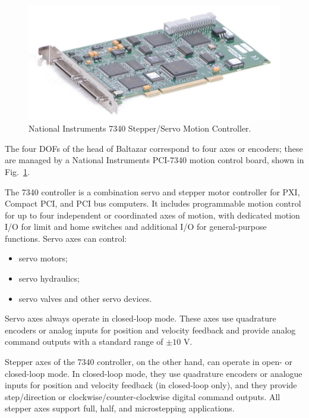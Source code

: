 
\begin{figure}
\centering
\includegraphics[scale=0.5]{figures/ni7340}
\caption[National Instruments 7340 Motion Controller]{National Instruments 7340 Stepper/Servo Motion Controller.}
\label{img:ni7340}
\end{figure}

The four \acp{DOF} of the head of Baltazar correspond to four axes or encoders; these are managed by a National Instruments PCI-7340 motion control board, shown in Fig.~\ref{img:ni7340}.

The 7340 controller is a combination servo and stepper motor controller for PXI, Compact PCI, and PCI bus computers. It includes programmable motion control for up to four independent or coordinated axes of motion, with dedicated motion I/O for limit and home switches and additional I/O for general-purpose functions. Servo axes can control:
\begin{itemize}
\item servo motors;

\item servo hydraulics;

\item servo valves and other servo devices.
\end{itemize}

Servo axes always operate in closed-loop mode. These axes use quadrature encoders or analog inputs for position and velocity feedback and provide analog command outputs with a standard range of $\pm 10$ V.

Stepper axes of the 7340 controller, on the other hand, can operate in open- or closed-loop mode. In closed-loop mode, they use quadrature encoders or analogue inputs for position and velocity feedback (in closed-loop only), and they provide step/direction or clockwise/counter-clockwise digital command outputs. All stepper axes support full, half, and microstepping applications.

